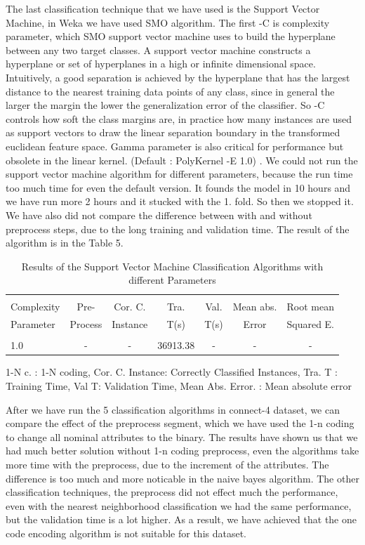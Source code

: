 \documentclass[a4paper]{article}
\begin{document}
The last classification technique that we have used is the Support Vector Machine, in Weka we have used SMO algorithm. The first -C is complexity parameter, which SMO support vector machine uses to build the hyperplane between any two target classes. A support vector machine constructs a hyperplane or set of hyperplanes in a high or infinite dimensional space. Intuitively, a good separation is achieved by the hyperplane that has the largest distance to the nearest training data points of any class, since in general the larger the margin the lower the generalization error of the classifier. So -C controls how soft the class margins are, in practice how many instances are used as support vectors to draw the linear separation boundary in the transformed euclidean feature space. Gamma parameter is also critical for performance but obsolete in the linear kernel. (Default : PolyKernel -E 1.0) . We could not run the support vector machine algorithm for different parameters, because the run time too much time for even the default version. It founds the model in 10 hours and we have run more 2 hours and it stucked with the 1. fold. So then we stopped it. We have also did not  compare the difference between with and without preprocess steps, due to the long training and validation time. The result of the algorithm is in the Table 5.

\begin{table}
\begin{tabular}{|l| c | c | c | c |c |c |}

\hline & & & & & & \\
Complexity & Pre- &  Cor. C. & Tra. & Val. & Mean abs.  & Root mean \\
Parameter & Process & Instance & T(s) &  T(s) & Error & Squared E. \\
\hline & & & & & & \\
1.0 & - &		  - &		36913.38	& 	-	 & 	-	 &  - \\ 
\hline
\end{tabular}

\caption{Results of the Support Vector Machine Classification Algorithms with different Parameters}
	 1-N c. : 1-N coding,
	Cor. C. Instance:  Correctly Classified Instances,
	Tra. T : Training Time,
	Val T: Validation Time,
	Mean Abs. Error. : Mean absolute error 
\end{table}

After we have run the 5 classification algorithms in connect-4 dataset, we can compare the effect of the preprocess segment, which we have used the 1-n coding to change all nominal attributes to the binary. The results have shown us that we had much better solution without 1-n coding preprocess, even the algorithms take more time with the preprocess, due to the increment of the attributes. The difference is too much and more noticable in the naive bayes algorithm. The other classification techniques, the preprocess did not effect much the performance, even with the nearest neighborhood classification we had the same performance, but the validation time is a lot higher. As a result, we have achieved that the one code encoding algorithm is not suitable for this dataset. 
\end{document}
